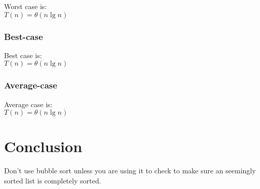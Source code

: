 \documentclass{article}
\begin{document}
Worst case is: \\

	$T(n) = \theta (n \lg{n})$

\subsubsection{Best-case}

Best case is: \\

	$T(n) = \theta (n \lg{n})$

\subsubsection{Average-case}

Average case is: \\

	$T(n) = \theta (n \lg{n})$


\section{Conclusion}

Don't use bubble sort unless you are using it to check to make sure an seemingly sorted list is completely sorted.
\end{document}

